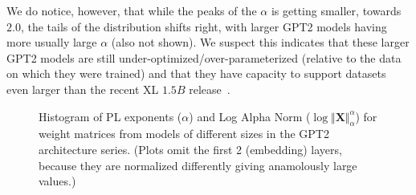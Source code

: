 We do notice, however, that while the peaks of the $\alpha$ is getting smaller, towards $2.0$, the tails of the distribution shifts right, with larger GPT2 models having more usually large $\alpha$ (also not shown).  
We suspect this indicates that these larger GPT2 models are still under-optimized/over-parameterized (relative to the data on which they were trained) and that they have capacity to support datasets even larger than the recent XL $1.5B$ release~\cite{gpt2-xl}.

\begin{figure}[htb]
    \centering

    \caption{Histogram of PL exponents ($\alpha$)
              and Log Alpha Norm ($\log\Vert\mathbf{X}\Vert_{\alpha}^{\alpha}$) for weight matrices from models of different sizes in the GPT2 architecture series.  (Plots omit the first 2 (embedding) layers, because they are normalized differently giving anamolously large values.)
             }
    \label{fig:gpt2-histograms}
\end{figure}

